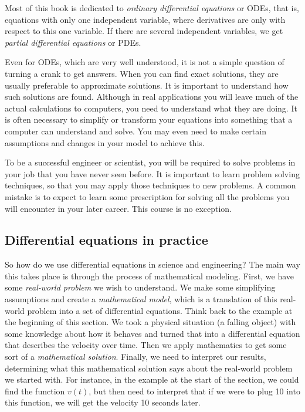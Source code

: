 \documentclass{ximera}
\begin{document}
Most of this book is dedicated to \emph{ordinary differential equations} or ODEs, that is, equations with only one independent variable, where derivatives are only with respect to this one variable. If there are several independent variables, we get \emph{partial differential equations} or PDEs.

Even for ODEs, which are very well understood, it is not a simple question of turning a crank to get answers. When you can find exact solutions, they are usually preferable to  approximate solutions.  It is important to understand how such solutions are found. Although in real applications you will leave much of the actual calculations to computers, you need to understand what they are doing.  It is often necessary to simplify or transform your equations into something that a computer can understand and solve. You may even need to make certain assumptions and changes in your model to achieve this.

To be a successful engineer or scientist, you will be required to solve problems in your job that you have never seen before.  It is important to learn problem solving techniques, so that you may apply those techniques to new problems.  A common mistake is to expect to learn some prescription for solving all the problems you will encounter in your later career.  This course is no exception.

\subsection{Differential equations in practice}

\begin{mywrapfigsimp}{3.05in}{3.35in}
    \noindent
    
\end{mywrapfigsimp}

So how do we use differential equations in science and engineering?  The main way this takes place is through the process of mathematical modeling. First, we have some \emph{real-world problem} we wish to understand. We make some simplifying assumptions and create a \emph{mathematical model}, which is a translation of this real-world problem into a set of differential equations. Think back to the example at the beginning of this section. We took a physical situation (a falling object) with some knowledge about how it behaves and turned that into a differential equation that describes the velocity over time. Then we apply mathematics to get some sort of a \emph{mathematical solution}. Finally, we need to interpret our results, determining what this mathematical solution says about the real-world problem we started with. For instance, in the example at the start of the section, we could find the function $v(t)$, but then need to interpret that if we were to plug 10 into this function, we will get the velocity 10 seconds later. 
\end{document}
